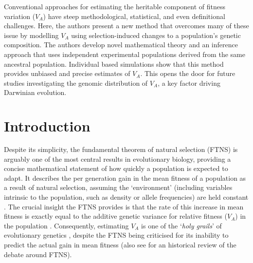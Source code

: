 \documentclass[12pt]{article}
\begin{document}
\begin{bibunit}
Conventional approaches for estimating the heritable component of fitness variation ($V_A$) have steep methodological, statistical, and even definitional challenges. Here, the authors present a new method that overcomes many of these issue by modelling $V_A$ using selection-induced changes to a population's genetic composition. The authors develop novel mathematical theory and an inference approach that uses independent experimental populations derived from the same ancestral population. Individual based simulations show that this method provides unbiased and precise estimates of $V_A$. This opens the door for future studies investigating the genomic distribution of $V_A$, a key factor driving Darwinian evolution.

\section*{Introduction}

Despite its simplicity, the fundamental theorem of natural selection (FTNS) \citep{fisher1930genetical,fisher1958genetical} is arguably one of the most central results in evolutionary biology, providing a concise mathematical statement of how quickly a population is expected to adapt. It describes the per generation gain in the mean fitness of a population as a result of natural selection, assuming the `environment' (including variables intrinsic to the population, such as density or allele frequencies) are held constant \citep{ewens1989interpretation, Frank.1992}. The crucial insight the FTNS provides is that the rate of this increase in mean fitness is exactly equal to the additive genetic variance for relative fitness ($V_A$) in the population \citep{burt1995evolution, grafen2015biological}. Consequently, estimating $V_A$ is one of the `\emph{holy grails}' of evolutionary genetics  \citep{walsh2022full}, despite the FTNS being criticised for its inability to predict the actual gain in mean fitness \citep{price1972fisher, ewens1989interpretation, ewens2024fundamental} (also see \citet{edwards1994fundamental} for an historical review of the debate around FTNS). 


\end{bibunit}
\end{document}
